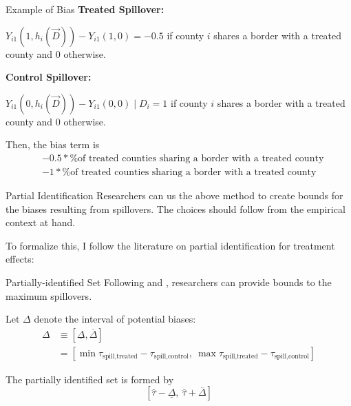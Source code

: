 \documentclass[aspectratio=43]{beamer}
\begin{document}
\begin{frame}{Example of Bias}
    \textbf{Treated Spillover:}
    
    $Y_{i1}(1, h_i(\vec{D})) - Y_{i1}(1, 0) = -0.5$ if county $i$ shares a border with a treated county and $0$ otherwise.
        
    \textbf{Control Spillover:}
    
    $Y_{i1}(0, h_i(\vec{D})) - Y_{i1}(0, 0) \mid D_i = 1$ if county $i$ shares a border with a treated county and $0$ otherwise.
        
    Then, the bias term is 
    \begin{align*}
        &-0.5 * \text{\% of treated counties sharing a border with a treated county} \\
        &-1 * \text{\% of treated counties sharing a border with a treated county}
    \end{align*}
\end{frame}

\begin{frame}{Partial Identification}
    Researchers can us the above method to create bounds for the biases resulting from spillovers. The choices should follow from the empirical context at hand.

    To formalize this, I follow the literature on partial identification for treatment effects: 
    
    \begin{citecolor}
    \end{citecolor}
\end{frame}

\begin{frame}{Partially-identified Set}
    Following \citet{Rambachan_Roth_2020} and \citet{Manski_Pepper_2018}, researchers can provide bounds to the maximum spillovers. 

    Let $\Delta$ denote the interval of potential biases: 
    \begin{align*}
        \Delta &\equiv [\underline{\Delta}, \overline{\Delta}] \\
        &= \left[ \min \tau_{\text{spill,treated}} - \tau_{\text{spill,control}}, \ \max \tau_{\text{spill,treated}} - \tau_{\text{spill,control}} \right] 
    \end{align*}

    The partially identified set is formed by \[ 
        \left[\hat{\tau} - \underline{\Delta} , \ \hat{\tau} + \overline{\Delta} \right]    
    \]

\end{frame}
\end{document}
